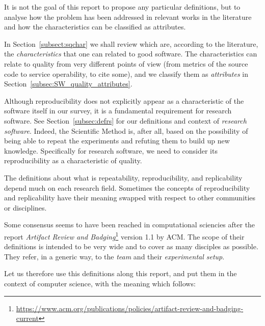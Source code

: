 It is not the goal of this report to propose any particular definitions, but to analyse how the problem has been addressed in relevant works in the literature and how the characteristics can be classified as attributes.

In Section~\ref{subsect:sqchar} we shall review which are, according to the literature, the \textit{characteristics} that one can related to good software. The characteristics can relate to quality from very different points of view (from metrics of the source code to service operability, to cite some), and we classify them as \textit{attributes} in Section~\ref{subsec:SW_quality_attributes}.

Although reproducibility does not explicitly appear as a characteristic of the software itself in our survey, it is a fundamental requirement for research software. See Section~\ref{subsec:defrs} for our definitions and context of \textit{research software}. Indeed, the Scientific Method is, after all, based on the possibility of being able to repeat the experiments and refuting them to build up new knowledge. Specifically for research software, we need to consider its reproducibility as a characteristic of quality.

The definitions about what is repeatability, reproducibility, and replicability depend much on each research field. Sometimes the concepts of reproducibility and replicability have their meaning swapped with respect to other communities or disciplines.

Some consensus seems to have been reached in computational sciencies after the report \textit{Artifact Review and Badging}\footnote{\url{https://www.acm.org/publications/policies/artifact-review-and-badging-current}} version 1.1 by ACM. The scope of their definitions is intended to be very wide and to cover as many disciples as possible. They refer, in a generic way, to the \textit{team} and their \textit{experimental setup}.

Let us therefore use this definitions along this report, and put them in the context of computer science, with the meaning which follows:

